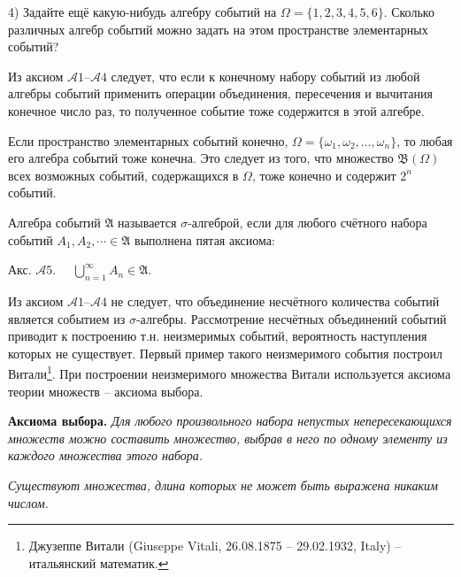 4) Задайте ещё какую-нибудь алгебру событий на $\Omega = \{1, 2, 3, 4, 5, 6\}$.
Сколько различных алгебр событий можно задать на этом пространстве элементарных событий?

\begin{zam}
	\label{zam:2.9}
Из аксиом $\mathcal{A}1$--$\mathcal{A}4$ следует, что если к конечному набору событий из любой алгебры событий применить операции объединения, пересечения и вычитания конечное число раз, то полученное событие тоже содержится в этой алгебре.
\end{zam}

\begin{zam}
	\label{zam:2.10}
Если пространство элементарных событий конечно, $\Omega = \{\omega_1,\omega_2,\ldots,\omega_n\}$, то любая его алгебра событий тоже конечна. 
Это следует из того, что множество $\mathfrak{B}(\Omega)$ всех возможных событий, содержащихся в $\Omega$, тоже конечно и содержит $2^n$ событий.
\end{zam}

\begin{definition}
	\label{def:2.11}
Алгебра событий $\mathfrak{A}$ называется $\sigma$-алгеброй, если для любого счётного набора событий $A_1,A_2,\cdots \in \mathfrak{A}$ выполнена пятая аксиома:

Акс. $\mathcal{A}5$.$\quad$ $\bigcup\limits_{n=1}^\infty A_n \in\mathfrak{A}$.
\end{definition}


\begin{zam}
	\label{zam:2.12}
Из аксиом $\mathcal{A}1$--$\mathcal{A}4$ не следует, что объединение несчётного количества событий является событием из $\sigma$-алгебры. 
Рассмотрение несчётных объединений событий приводит к построению т.н. неизмеримых событий, вероятность наступления которых не существует. 
Первый пример такого неизмеримого события построил Витали\footnote{Джузеппе Витали (Giuseppe Vitali, 26.08.1875 -- 29.02.1932, Italy) -- итальянский математик.}. 
При построении неизмеримого множества Витали используется аксиома теории множеств -- аксиома выбора.
\end{zam}

\textbf{Аксиома выбора.} \textit{Для любого произвольного набора непустых непересекающихся множеств можно составить множество, выбрав в него по одному элементу из каждого множества этого набора.}

\begin{theorem}
	\label{th:2.13}
\textit{Существуют множества, длина которых не может быть выражена никаким числом.}
\end{theorem}

